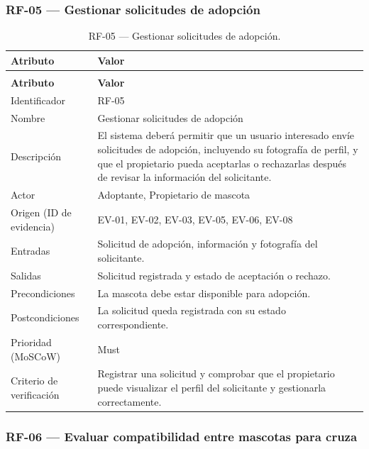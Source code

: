 \documentclass[journal,onecolumn]{IEEEtran}
\makeatletter
\newenvironment{atributos}[2]{%
	\small
	\begin{longtable}{@{}>{\raggedright\arraybackslash}p{4.2cm} >{\raggedright\arraybackslash}p{11.2cm}@{}}
		\caption{#2}\label{tab:#1}\\
		\toprule
		\textbf{Atributo} & \textbf{Valor} \\
		\midrule
		\endfirsthead
		\multicolumn{2}{@{}l}{\small\itshape (continuación)}\\
		\toprule
		\textbf{Atributo} & \textbf{Valor} \\
		\midrule
		\endhead
		\bottomrule
		\endlastfoot
	}{%
	\end{longtable}
	\normalsize
}
\makeatother
\begin{document}
	\subsubsection{RF-05 --- Gestionar solicitudes de adopción}
	
	\begin{atributos}{RF-05}{RF-05 --- Gestionar solicitudes de adopción.}
		Identificador & RF-05 \\
		Nombre & Gestionar solicitudes de adopción \\
		Descripción & El sistema deberá permitir que un usuario interesado envíe solicitudes de adopción, incluyendo su fotografía de perfil, y que el propietario pueda aceptarlas o rechazarlas después de revisar la información del solicitante. \\
		Actor & Adoptante, Propietario de mascota \\
		Origen (ID de evidencia) & EV-01, EV-02, EV-03, EV-05, EV-06, EV-08 \\
		Entradas & Solicitud de adopción, información y fotografía del solicitante. \\
		Salidas & Solicitud registrada y estado de aceptación o rechazo. \\
		Precondiciones & La mascota debe estar disponible para adopción. \\
		Postcondiciones & La solicitud queda registrada con su estado correspondiente. \\
		Prioridad (MoSCoW) & Must \\
		Criterio de verificación & Registrar una solicitud y comprobar que el propietario puede visualizar el perfil del solicitante y gestionarla correctamente. \\
	\end{atributos}
	
	\subsubsection{RF-06 --- Evaluar compatibilidad entre mascotas para cruza}
	
\end{document}
